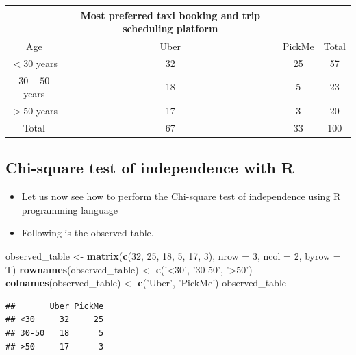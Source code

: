 \documentclass[]{book}
\newenvironment{Shaded}{\begin{snugshade}}{\end{snugshade}}
\newcommand{\DataTypeTok}[1]{\textcolor[rgb]{0.13,0.29,0.53}{#1}}
\newcommand{\DecValTok}[1]{\textcolor[rgb]{0.00,0.00,0.81}{#1}}
\newcommand{\KeywordTok}[1]{\textcolor[rgb]{0.13,0.29,0.53}{\textbf{#1}}}
\newcommand{\NormalTok}[1]{#1}
\newcommand{\StringTok}[1]{\textcolor[rgb]{0.31,0.60,0.02}{#1}}
\providecommand{\tightlist}{%
  \setlength{\itemsep}{0pt}\setlength{\parskip}{0pt}}
\begin{document}
\begin{longtable}[]{@{}cccc@{}}
\toprule
& Most preferred taxi booking and trip scheduling platform & &\tabularnewline
\midrule
\endhead
Age & Uber & PickMe & Total\tabularnewline
\(< 30\) years & 32 & 25 & 57\tabularnewline
\(30-50\) years & 18 & 5 & 23\tabularnewline
\(> 50\) years & 17 & 3 & 20\tabularnewline
Total & 67 & 33 & 100\tabularnewline
\bottomrule
\end{longtable}

\hypertarget{chi-square-test-of-independence-with-r}{%
\subsection{Chi-square test of independence with R}\label{chi-square-test-of-independence-with-r}}

\begin{itemize}
\tightlist
\item
  Let us now see how to perform the Chi-square test of independence using R programming language
\end{itemize}

\begin{itemize}
\tightlist
\item
  Following is the observed table.
\end{itemize}

\begin{Shaded}
\begin{Highlighting}[]
\NormalTok{observed_table <-}\StringTok{ }\KeywordTok{matrix}\NormalTok{(}\KeywordTok{c}\NormalTok{(}\DecValTok{32}\NormalTok{, }\DecValTok{25}\NormalTok{, }\DecValTok{18}\NormalTok{, }\DecValTok{5}\NormalTok{, }\DecValTok{17}\NormalTok{, }\DecValTok{3}\NormalTok{), }\DataTypeTok{nrow =} \DecValTok{3}\NormalTok{, }\DataTypeTok{ncol =} \DecValTok{2}\NormalTok{, }\DataTypeTok{byrow =}\NormalTok{ T)}
\KeywordTok{rownames}\NormalTok{(observed_table) <-}\StringTok{ }\KeywordTok{c}\NormalTok{(}\StringTok{'<30'}\NormalTok{, }\StringTok{'30-50'}\NormalTok{, }\StringTok{'>50'}\NormalTok{)}
\KeywordTok{colnames}\NormalTok{(observed_table) <-}\StringTok{ }\KeywordTok{c}\NormalTok{(}\StringTok{'Uber'}\NormalTok{, }\StringTok{'PickMe'}\NormalTok{)}
\NormalTok{observed_table}
\end{Highlighting}
\end{Shaded}

\begin{verbatim}
##       Uber PickMe
## <30     32     25
## 30-50   18      5
## >50     17      3
\end{verbatim}
\end{document}
